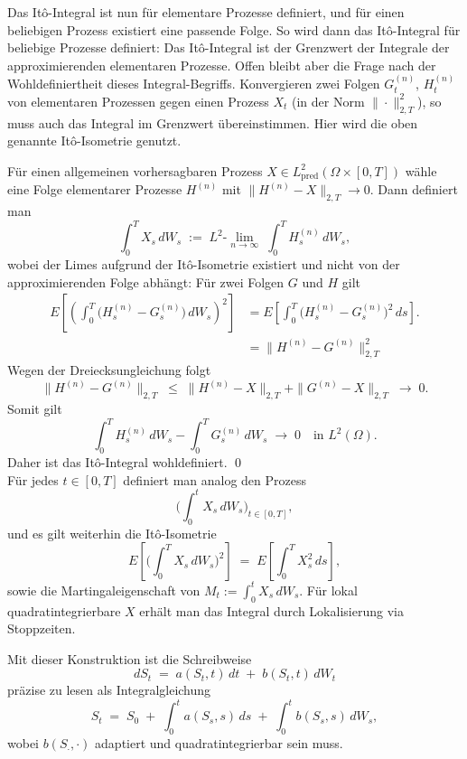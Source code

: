 \begin{defi}[It\^o-Integral]
Das It\^o-Integral ist nun für elementare Prozesse definiert, und für einen beliebigen Prozess existiert
eine passende Folge. So wird dann das It\^o-Integral für beliebige Prozesse definiert: Das It\^o-Integral ist der Grenzwert der Integrale der approximierenden elementaren Prozesse.
Offen bleibt aber die Frage nach der Wohldefiniertheit dieses Integral-Begriffs. Konvergieren zwei Folgen $G_t^{(n)}$, $H_t^{(n)}$ von
elementaren Prozessen gegen einen Prozess $X_t$ (in der Norm $\|\cdot\|_{2,T}^2$), so muss auch das Integral im Grenzwert übereinstimmen.
Hier wird die oben genannte It\^o-Isometrie genutzt.

Für einen allgemeinen vorhersagbaren Prozess $X\in L^2_{\mathrm{pred}}(\Omega\times[0,T])$ wähle eine Folge elementarer Prozesse $H^{(n)}$ mit
$\|H^{(n)}-X\|_{2,T}\to 0$. Dann definiert man
$$
\int_0^T X_s\,dW_s \;:=\; L^2\text{-}\lim_{n\to\infty}\;\int_0^T H^{(n)}_s\,dW_s,
$$
wobei der Limes aufgrund der It\^o-Isometrie existiert und nicht von der approximierenden Folge abhängt:
Für zwei Folgen $G$ und $H$ gilt
$$
\begin{aligned}
E\!\left[
   \left( \int_0^T \big(H^{(n)}_s - G^{(n)}_s\big)\,dW_s \right)^2
\right]
&= 
E \left [ \int_0^T \big(H^{(n)}_s - G^{(n)}_s\big)^2\,ds \right ].
\\ &= \|H^{(n)} - G^{(n)}\|_{2,T}^2
\end{aligned}
$$
Wegen der Dreiecksungleichung folgt
$$
\|H^{(n)} - G^{(n)}\|_{2,T} 
\;\le\; 
\|H^{(n)} - X\|_{2,T} + \|G^{(n)} - X\|_{2,T}
\;\to\; 0.
$$
Somit gilt
$$
\int_0^T H^{(n)}_s\,dW_s - \int_0^T G^{(n)}_s\,dW_s 
\;\to\; 0 \quad \text{in } L^2(\Omega).
$$
Daher ist das It\^o-Integral wohldefiniert. \qed \\
Für jedes $t\in[0,T]$ definiert man analog den Prozess
$$
\Big(\int_0^t X_s\,dW_s\Big)_{t\in[0,T]},
$$
und es gilt weiterhin die It\^o-Isometrie
$$
E\!\left[\Big(\int_0^T X_s\,dW_s\Big)^{\!2}\right] \;=\; E\!\left[\int_0^T X_s^{2}\,ds\right],
$$
sowie die Martingaleigenschaft von $M_t:=\int_0^t X_s\,dW_s$. Für lokal quadratintegrierbare $X$ erhält man das Integral durch Lokalisierung via Stoppzeiten.
\end{defi}

\begin{defi}
Mit dieser Konstruktion ist die Schreibweise
$$
dS_t \;=\; a(S_t,t)\,dt \;+\; b(S_t,t)\,dW_t
$$
präzise zu lesen als Integralgleichung
$$
S_t \;=\; S_0 \;+\; \int_0^t a(S_s,s)\,ds \;+\; \int_0^t b(S_s,s)\,dW_s,
$$
wobei $b(S_\cdot,\cdot)$ adaptiert und quadratintegrierbar sein muss.
\end{defi}

